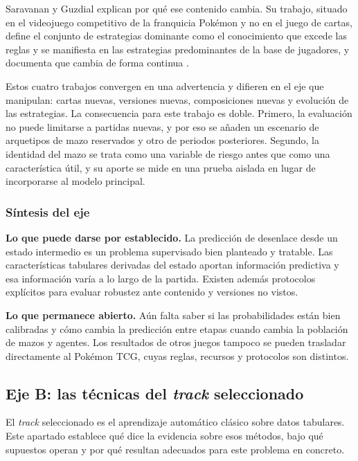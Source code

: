 Saravanan y Guzdial explican por qué ese contenido cambia. Su trabajo,
situado en el videojuego competitivo de la franquicia Pok\'emon y no en el
juego de cartas, define el conjunto de estrategias dominante como el
conocimiento que excede las reglas y se manifiesta en las estrategias
predominantes de la base de jugadores, y documenta que cambia de forma
continua \cite{saravanan_metadiscovery_2024}.

Estos cuatro trabajos convergen en una advertencia y difieren en el eje que
manipulan: cartas nuevas, versiones nuevas, composiciones nuevas y evolución
de las estrategias. La consecuencia para este trabajo es doble. Primero, la
evaluación no puede limitarse a partidas nuevas, y por eso se añaden un
escenario de arquetipos de mazo reservados y otro de periodos posteriores. Segundo, la
identidad del mazo se trata como una variable de riesgo antes que como una
característica útil, y su aporte se mide en una prueba aislada en lugar de
incorporarse al modelo principal.

\subsubsection{Síntesis del eje}

\noindent\textbf{Lo que puede darse por establecido.} La predicción de
desenlace desde un estado intermedio es un problema supervisado bien
planteado y tratable. Las características tabulares derivadas del estado
aportan información predictiva y esa información varía a lo largo
de la partida. Existen además protocolos explícitos para evaluar robustez
ante contenido y versiones no vistos.

\noindent\textbf{Lo que permanece abierto.} Aún falta saber si las
probabilidades están bien calibradas y cómo cambia la predicción entre
etapas cuando cambia la población de mazos y agentes. Los resultados de otros
juegos tampoco se pueden trasladar directamente al Pok\'emon TCG, cuyas
reglas, recursos y protocolos son distintos.

\subsection{Eje B: las técnicas del \textit{track} seleccionado}
\label{subsec:ejeb}

El \textit{track} seleccionado es el aprendizaje automático clásico sobre
datos tabulares. Este apartado establece qué dice la evidencia sobre esos
métodos, bajo qué supuestos operan y por qué resultan adecuados para este
problema en concreto.

